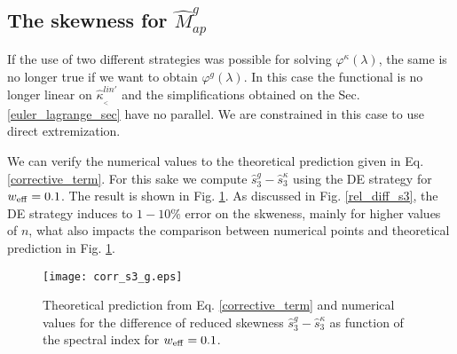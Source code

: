 \documentclass[twocolumn,aps,reprint, nofootinbib]{revtex4}
\newcommand{\eff}{{\rm eff}}
\newcommand{\w}{{w_{\eff}}}
\newcommand{\hkappa}{\hat{\kappa}_{_<}}
\newcommand{\Mapg}{\hat{M}_{ap}^g}
\newcommand{\varphik}{\varphi^{\kappa}}
\newcommand{\varphir}{\varphi^{g}}
\begin{document}
\subsection{The skewness for $\Mapg$}
If the use of two different strategies was possible for solving $\varphik(\lambda)$, the same is no longer true if we want to obtain $\varphir(\lambda)$. In this case the functional is no longer linear on $\hkappa^{lin'}$ and the simplifications obtained on the Sec. \ref{euler_lagrange_sec} have no parallel. We are constrained in this case to use direct extremization.

We can verify the numerical values to the theoretical prediction given in Eq. \eqref{corrective_term}. For this sake we compute $\hat{s}_3^g - \hat{s}_3^\kappa$ using the DE strategy for $\w=0.1$. The result is shown in Fig. \ref{corr_term}. As discussed in Fig. \ref{rel_diff_s3}, the DE strategy induces to $1 - 10\%$ error on the skweness, mainly for higher values of $n$, what also impacts the comparison between numerical points and theoretical prediction in Fig. \ref{corr_term}.

\begin{figure}[!ht]
\centering
\texttt{[image: corr\_s3\_g.eps]}
\caption{Theoretical prediction from Eq. \eqref{corrective_term} and numerical values for the difference of reduced skewness $\hat{s}_3^g - \hat{s}_3^\kappa$ as function of the spectral index for $\w=0.1$. }
\label{corr_term}
\end{figure}

 
\end{document}
